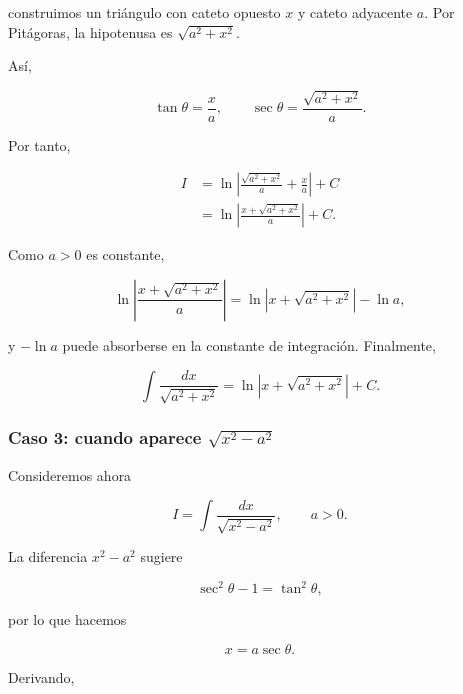 \documentclass[12pt]{article}
\theoremstyle{definition}
\theoremstyle{remark}
\begin{document}
construimos un triángulo con cateto opuesto $x$ y cateto adyacente $a$.
Por Pitágoras, la hipotenusa es $\sqrt{a^2+x^2}$.

\begin{center}
\end{center}

Así,

\[
\tan\theta=\frac{x}{a},
\qquad
\sec\theta=\frac{\sqrt{a^2+x^2}}{a}.
\]

Por tanto,

\begin{align*}
I
&=\ln\left|
\frac{\sqrt{a^2+x^2}}{a}+\frac{x}{a}
\right|+C\\
&=\ln\left|
\frac{x+\sqrt{a^2+x^2}}{a}
\right|+C.
\end{align*}

Como $a>0$ es constante,

\[
\ln\left|\frac{x+\sqrt{a^2+x^2}}{a}\right|
=\ln|x+\sqrt{a^2+x^2}|-\ln a,
\]

y $-\ln a$ puede absorberse en la constante de integración. Finalmente,

\[
\boxed{
\int\frac{dx}{\sqrt{a^2+x^2}}
=\ln|x+\sqrt{a^2+x^2}|+C.}
\]

\subsubsection*{Caso 3: cuando aparece \(\sqrt{x^2-a^2}\)}

Consideremos ahora

\[
I=\int\frac{dx}{\sqrt{x^2-a^2}},\qquad a>0.
\]

La diferencia $x^2-a^2$ sugiere

\[
\sec^2\theta-1=\tan^2\theta,
\]

por lo que hacemos

\[
\boxed{x=a\sec\theta}.
\]

Derivando,
\end{document}
